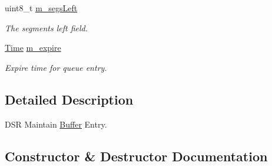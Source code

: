 \begin{DoxyCompactItemize}
uint8\+\_\+t \hyperlink{classns3_1_1dsr_1_1DsrMaintainBuffEntry_a316c2a3e461de13688931c5df76db791}{m\+\_\+segs\+Left}
\begin{DoxyCompactList}\small\item\em The segments left field. \end{DoxyCompactList}\item 
\hyperlink{classns3_1_1Time}{Time} \hyperlink{classns3_1_1dsr_1_1DsrMaintainBuffEntry_abeb73f767b8756a6d7f9d9494ea903fe}{m\+\_\+expire}
\begin{DoxyCompactList}\small\item\em Expire time for queue entry. \end{DoxyCompactList}\end{DoxyCompactItemize}


\subsection{Detailed Description}
D\+SR Maintain \hyperlink{classns3_1_1Buffer}{Buffer} Entry. 

\subsection{Constructor \& Destructor Documentation}
